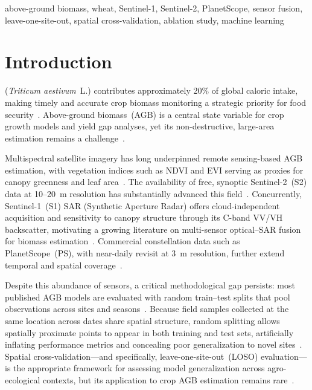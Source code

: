 \documentclass[lettersize,journal]{IEEEtran}
\begin{document}
\begin{IEEEkeywords}
above-ground biomass, wheat, Sentinel-1, Sentinel-2, PlanetScope,
sensor fusion, leave-one-site-out, spatial cross-validation, ablation study,
machine learning
\end{IEEEkeywords}

\section{Introduction}
 (\textit{Triticum aestivum}~L.) contributes
approximately 20\% of global caloric intake, making timely and accurate crop
biomass monitoring a strategic priority for food security~\cite{ref1}.
Above-ground biomass~(AGB) is a central state variable for crop growth models
and yield gap analyses, yet its non-destructive, large-area estimation remains
a challenge~\cite{ref2}.

Multispectral satellite imagery has long underpinned remote sensing-based AGB
estimation, with vegetation indices such as NDVI and EVI serving as proxies
for canopy greenness and leaf area~\cite{ref3}. The availability of free,
synoptic Sentinel-2~(S2) data at 10--20~m resolution has substantially
advanced this field~\cite{ref4}. Concurrently, Sentinel-1~(S1) SAR (Synthetic Aperture Radar) offers
cloud-independent acquisition and sensitivity to canopy structure through its
C-band VV/VH backscatter, motivating a growing literature on multi-sensor
optical--SAR fusion for biomass estimation~\cite{ref5,ref6}. Commercial
constellation data such as PlanetScope~(PS), with near-daily revisit at 3~m
resolution, further extend temporal and spatial coverage~\cite{ref7}.

Despite this abundance of sensors, a critical methodological gap persists:
most published AGB models are evaluated with random train--test splits that
pool observations across sites and seasons~\cite{ref8}. Because field samples
collected at the same location across dates share spatial structure, random
splitting allows spatially proximate points to appear in both training and test
sets, artificially inflating performance metrics and concealing poor
generalization to novel sites~\cite{ref9}. Spatial cross-validation---and
specifically, leave-one-site-out~(LOSO) evaluation---is the appropriate
framework for assessing model generalization across agro-ecological contexts,
but its application to crop AGB estimation remains rare~\cite{ref10}.
\end{document}
